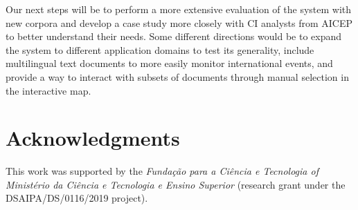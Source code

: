 \documentclass[a4paper]{article}
\begin{document}
Our next steps will be to perform a more extensive evaluation of the system with new corpora and develop a case study more closely with CI analysts from AICEP to better understand their needs. Some different directions would be to expand the system to different application domains to test its generality, include multilingual text documents to more easily monitor international events, and provide a way to interact with subsets of documents through manual selection in the interactive map.

\section*{Acknowledgments}
This work was supported by the \emph{Fundação para a Ciência e Tecnologia of Ministério da Ciência e Tecnologia e Ensino Superior} (research grant under the DSAIPA/DS/0116/2019 project).




\appendix
\end{document}
